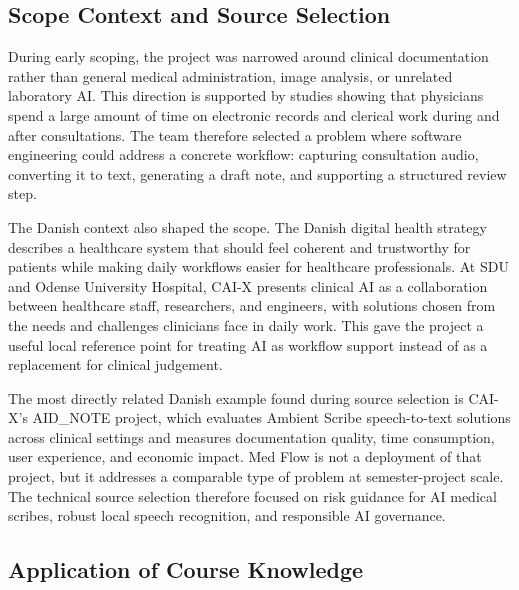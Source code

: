 \subsection{Scope Context and Source Selection}
\label{subsec:scope-context-source-selection}

During early scoping, the project was narrowed around clinical documentation rather than general medical administration, image analysis, or unrelated laboratory AI. This direction is supported by studies showing that physicians spend a large amount of time on electronic records and clerical work during and after consultations. The team therefore selected a problem where software engineering could address a concrete workflow: capturing consultation audio, converting it to text, generating a draft note, and supporting a structured review step.

The Danish context also shaped the scope. The Danish digital health strategy describes a healthcare system that should feel coherent and trustworthy for patients while making daily workflows easier for healthcare professionals. At SDU and Odense University Hospital, CAI-X presents clinical AI as a collaboration between healthcare staff, researchers, and engineers, with solutions chosen from the needs and challenges clinicians face in daily work. This gave the project a useful local reference point for treating AI as workflow support instead of as a replacement for clinical judgement.

The most directly related Danish example found during source selection is CAI-X's AID\_NOTE project, which evaluates Ambient Scribe speech-to-text solutions across clinical settings and measures documentation quality, time consumption, user experience, and economic impact. Med Flow is not a deployment of that project, but it addresses a comparable type of problem at semester-project scale. The technical source selection therefore focused on risk guidance for AI medical scribes, robust local speech recognition, and responsible AI governance.

\subsection{Application of Course Knowledge}
\label{subsec:course-knowledge}

